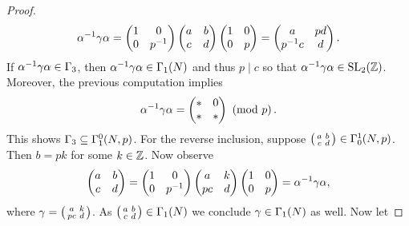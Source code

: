 \begin{proof}
        \[
          \alpha^{-1}\gamma\alpha = \begin{pmatrix} 1 & 0 \\ 0 & p^{-1} \end{pmatrix}\begin{pmatrix} a & b \\ c & d \end{pmatrix}\begin{pmatrix} 1 & 0 \\ 0 & p \end{pmatrix} = \begin{pmatrix} a & pd \\ p^{-1}c & d \end{pmatrix}.
        \]
        If $\alpha^{-1}\gamma\alpha \in \Gamma_{3}$, then $\alpha^{-1}\gamma\alpha \in \Gamma_{1}(N)$ and thus $p \mid c$ so that $\alpha^{-1}\gamma\alpha \in \mathrm{SL}_{2}(\mathbb{Z})$. Moreover, the previous computation implies
        \[
          \alpha^{-1}\gamma\alpha = \begin{pmatrix} \ast & 0 \\ \ast & \ast \end{pmatrix} \ \left(\text{mod }p\right).
        \]
        This shows $\Gamma_{3} \subseteq \Gamma_{1}^{0}(N,p)$. For the reverse inclusion, suppose $\begin{psmallmatrix} a & b \\ c & d \end{psmallmatrix} \in \Gamma_{0}^{1}(N,p)$. Then $b = pk$ for some $k \in \mathbb{Z}$. Now observe
        \[
          \begin{pmatrix} a & b \\ c & d \end{pmatrix} = \begin{pmatrix} 1 & 0 \\ 0 & p^{-1} \end{pmatrix}\begin{pmatrix} a & k \\ pc & d \end{pmatrix}\begin{pmatrix} 1 & 0 \\ 0 & p \end{pmatrix} = \alpha^{-1}\gamma\alpha,
        \]
        where $\gamma = \begin{psmallmatrix} a & k \\ pc & d \end{psmallmatrix}$. As $\begin{psmallmatrix} a & b \\ c & d \end{psmallmatrix} \in \Gamma_{1}(N)$ we conclude $\gamma \in \Gamma_{1}(N)$ as well. Now let

\end{proof}
